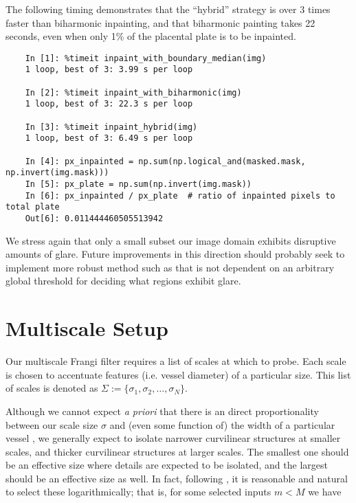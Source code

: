     The following timing demonstrates that the ``hybrid'' strategy is over 3 times faster than biharmonic inpainting, and that biharmonic painting takes 22 seconds, even when only 1\% of the placental plate is to be inpainted.
    
    \begin{lstlisting}
    In [1]: %timeit inpaint_with_boundary_median(img)
    1 loop, best of 3: 3.99 s per loop
    
    In [2]: %timeit inpaint_with_biharmonic(img)
    1 loop, best of 3: 22.3 s per loop
    
    In [3]: %timeit inpaint_hybrid(img)
    1 loop, best of 3: 6.49 s per loop
    
    In [4]: px_inpainted = np.sum(np.logical_and(masked.mask, np.invert(img.mask)))
    In [5]: px_plate = np.sum(np.invert(img.mask))
    In [6]: px_inpainted / px_plate  # ratio of inpainted pixels to total plate 
    Out[6]: 0.011444460505513942
    \end{lstlisting}

    
    We stress again that only a small subset our image domain exhibits disruptive amounts of glare. Future improvements in this direction should probably seek to implement more robust method such as \cite{lange2005glare} that is not dependent on an arbitrary global
    threshold for deciding what regions exhibit glare.
    
    
\section{Multiscale Setup}

    Our multiscale Frangi filter requires a list of scales at which to probe. Each scale is chosen to accentuate features (i.e. vessel diameter) of a particular size.
    This list of scales is denoted as $\Sigma := \{ \sigma_1, \sigma_2, \dots, \sigma_N\}$. 
    
    Although we cannot expect \textit{a priori} that there is an direct proportionality between our scale size $\sigma$ and (even some function of) the width of a particular vessel \cite{frangi-paper}, we generally expect to isolate
    narrower curvilinear structures at smaller scales, and thicker curvilinear structures at larger scales.  The smallest one should be an effective size where details are expected to be isolated, and the largest should be an effective size as well. In fact, following \cite{Koenderink}, it is reasonable and natural to select these logarithmically; that is, for some selected inputs $m < M$ we have
    
